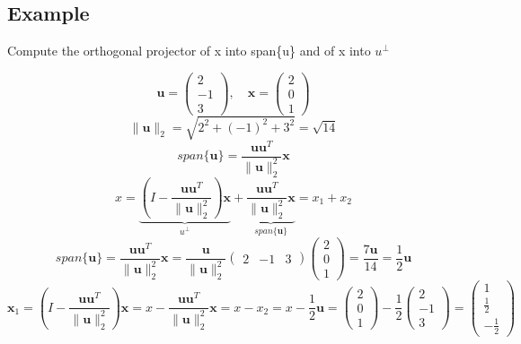 \subsection*{Example}
Compute the orthogonal projector of x into span\{u\} and of x into $u^\perp$

$$ \mathbf{u} = \begin{pmatrix} 2 \\ -1 \\ 3 \end{pmatrix}, \quad \mathbf{x} = \begin{pmatrix} 2 \\ 0 \\ 1 \end{pmatrix} $$
$$ \| \mathbf{u} \|_2 = \sqrt{2^2 + (-1)^2 + 3^2} = \sqrt{14} $$
$$ span\{\mathbf{u}\} =  \frac{\mathbf{u}\mathbf{u}^T}{\| \mathbf{u} \|_2^2}\mathbf{x}$$
$$ x = \underbrace{(I - \frac{\mathbf{u}\mathbf{u}^T}{\| \mathbf{u} \|_2^2})\mathbf{x}}_{u^\perp} + \underbrace{\frac{\mathbf{u}\mathbf{u}^T}{\| \mathbf{u} \|_2^2}\mathbf{x}}_{span\{\mathbf{u}\}} = x_1 + x_2 $$
$$ span\{\mathbf{u}\} = \frac{\mathbf{u}\mathbf{u}^T}{\| \mathbf{u} \|_2^2}\mathbf{x} = \frac{\mathbf{u}}{\| \mathbf{u} \|_2^2} \begin{pmatrix} 2 & -1 & 3 \end{pmatrix} \begin{pmatrix} 2 \\ 0 \\ 1 \end{pmatrix} = \frac{7\mathbf{u}}{14} = \frac{1}{2}\mathbf{u} $$
$$ \mathbf{x}_1 = (I - \frac{\mathbf{u}\mathbf{u}^T}{\| \mathbf{u} \|_2^2})\mathbf{x} = x - \frac{\mathbf{u}\mathbf{u}^T}{\| \mathbf{u} \|_2^2}\mathbf{x} = x - x_2 = x - \frac{1}{2}\mathbf{u} = \begin{pmatrix}
    2 \\ 0 \\ 1
\end{pmatrix} - \frac{1}{2} \begin{pmatrix}
    2 \\ -1 \\ 3
\end{pmatrix} = \begin{pmatrix}
    1 \\ \frac{1}{2} \\ -\frac{1}{2}
\end{pmatrix} $$
